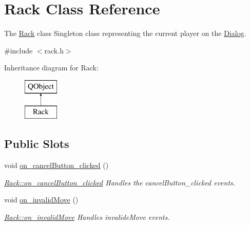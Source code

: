\hypertarget{class_rack}{\section{Rack Class Reference}
\label{class_rack}
}


The \hyperlink{class_rack}{Rack} class Singleton class representing the current player on the \hyperlink{class_dialog}{Dialog}.  




{\ttfamily \#include $<$rack.\-h$>$}

Inheritance diagram for Rack\-:\begin{figure}[H]
\begin{center}
\leavevmode
\includegraphics[height=2.000000cm]{class_rack}
\end{center}
\end{figure}
\subsection*{Public Slots}
\begin{DoxyCompactItemize}
\item 
void \hyperlink{class_rack_a7c2b198bbb87eda22a2524781dc09da3}{on\-\_\-cancel\-Button\-\_\-clicked} ()
\begin{DoxyCompactList}\small\item\em \hyperlink{class_rack_a7c2b198bbb87eda22a2524781dc09da3}{Rack\-::on\-\_\-cancel\-Button\-\_\-clicked} Handles the cancel\-Button\-\_\-clicked events. \end{DoxyCompactList}\item 
void \hyperlink{class_rack_a65c2e50299cb5ad7111ad56132b18c29}{on\-\_\-invalid\-Move} ()
\begin{DoxyCompactList}\small\item\em \hyperlink{class_rack_a65c2e50299cb5ad7111ad56132b18c29}{Rack\-::on\-\_\-invalid\-Move} Handles invalide\-Move events. \end{DoxyCompactList}\end{DoxyCompactItemize}
